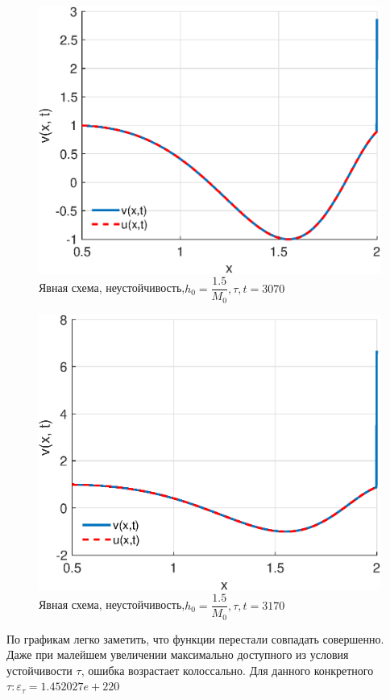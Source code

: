 \documentclass[12pt]{article}
\begin{document}
\begin{enumerate}
\begin{figure}[H]
\centerline{\includegraphics[scale = 0.7]{exp_d_t=3070.eps}}
\caption{Явная схема, неустойчивость,$h_0 = \dfrac{1.5}{M_0}, \tau, t = 3070$}
\end{figure} 

\begin{figure}[H]
\centerline{\includegraphics[scale = 0.7]{exp_d_t=3170.eps}}
\caption{Явная схема, неустойчивость,$h_0 = \dfrac{1.5}{M_0}, \tau, t = 3170$}
\end{figure} 

По графикам легко заметить, что функции перестали совпадать совершенно. Даже при малейшем  увеличении максимально доступного из условия устойчивости $\tau$, ошибка возрастает колоссально. Для данного конкретного $\tau: \varepsilon_{\tau} = 1.452027e+220$
 
\end{enumerate}
\end{document}
